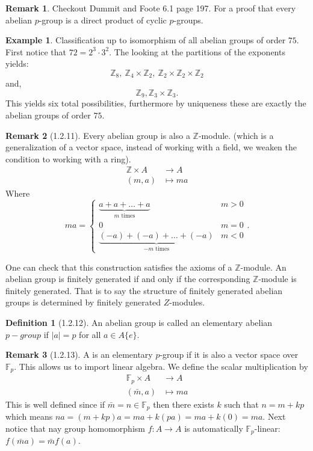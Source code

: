 \documentclass[11pt,leqno,oneside]{amsart}
\newcommand{\Z}{{\mathbb Z}} %
\newcommand{\Fp}{{\mathbb{F}_p}} %
\theoremstyle{definition}
\newtheorem*{defn*}{Definition}
\newtheorem*{example*}{Example}
\newtheorem*{rmk*}{Remark}
\numberwithin{equation}{section}
\begin{document}
\begin{rmk*}
  Checkout Dummit and Foote 6.1 page
  197. For a proof that every abelian
  \(p\)-group is a direct product of
  cyclic \(p\)-groups.
\end{rmk*}

\begin{example*}
  Classification up to isomorphism of
  all abelian groups of order
  \(75\). First notice that
  \(72=2^3 \cdot 3^2\). The looking at
  the partitions of the exponents
  yields:
  \[\Z_8,\ \Z_4 \times \Z_2,\ \Z_2
    \times \Z_2 \times \Z_2\] and,
  \[\Z_9, \Z_3 \times \Z_3.\]
  This yields six total possibilities,
  furthermore by uniqueness these are
  exactly the abelian groups of order
  \(75\).
\end{example*}

\begin{rmk*}[1.2.11]
  Every abelian group is also a
  \(\Z\)-module. (which is a
  generalization of a vector space,
  instead of working with a field, we
  weaken the condition to working with a
  ring).
  \begin{align*}
    \Z \times A &\longrightarrow A\\
    (m,a)& \mapsto ma
  \end{align*}
  Where
  \[ma =
    \begin{cases}
      \underbrace{a+a+\ldots+a}_{m \text{ times}} & m > 0\\
      0 & m=0\\
      \underbrace{(-a)+(-a)+\ldots+(-a)}_{-m
        \text{ times}} & m < 0
    \end{cases}.
  \]
\end{rmk*}
One can check that this construction
satisfies the axioms of a
\(\Z\)-module. An abelian group is
finitely generated if and only if the
corresponding \(\Z\)-module is finitely
generated. That is to say the structure
of finitely generated abelian groups is
determined by finitely generated
\(Z\)-modules.

\begin{defn*}[1.2.12]
  An abelian group is called an
  elementary abelian \(p-group\) if
  \(|a|=p\) for all \(a \in A\{e\}\).
\end{defn*}

\begin{rmk*}[1.2.13]
  A is an elementary \(p\)-group if it
  is also a vector space over
  \(\Fp\). This allows us to import
  linear algebra. We define the scalar
  multiplication by
  \begin{align*}
    \Fp \times A &\longrightarrow A\\
    (\bar{m},a) &\longmapsto ma
  \end{align*}
  This is well defined since if
  \(\bar{m} = n \in \Fp\) then there
  exists \(k\) such that \(n=m+kp\)
  which means
  \(na=(m+kp)a=ma+k(pa)=ma+k(0)=ma\). Next
  notice that nay group homomorphism
  \(f \colon A \to A\) is automatically
  \(\Fp\)-linear:
  \(f(\bar{m}a)=\bar{m}f(a)\).
\end{rmk*}
\end{document}
